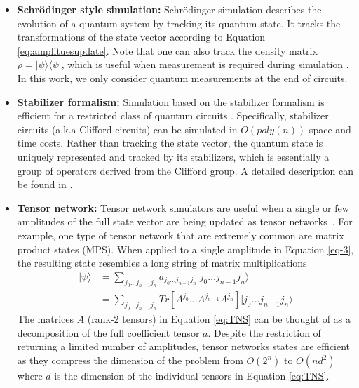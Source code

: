 \begin{itemize}
\item \textbf{Schr\"odinger style simulation:} Schr\"odinger simulation describes the evolution of a quantum system by tracking its quantum state. 
It tracks the transformations of the state vector according to Equation \ref{eq:amplituesupdate}. 
Note that one can also track the density matrix $\rho = |\psi\rangle\langle\psi|$, which is useful when measurement is required during  simulation \cite{10.1109/SC41405.2020.00017, 10.1007/978-3-031-01765-0}. In this work, we only consider quantum measurements at the end of circuits.

\item \textbf{Stabilizer formalism:} Simulation based on the stabilizer formalism is efficient for a restricted class of quantum circuits \cite{10.1103/PhysRevA.70.052328,nielsen_chuang_2010,10.1007/978-3-031-01765-0}. Specifically, stabilizer circuits (a.k.a Clifford circuits) can be simulated in $O(poly(n))$ space and time costs. Rather than tracking the state vector, the quantum state is uniquely represented and tracked by its stabilizers, which is essentially a group of operators derived from the Clifford group. A detailed description can be found in \cite{10.1103/PhysRevA.70.052328}.

\item \textbf{Tensor network:}
Tensor network simulators are useful when a single or few amplitudes of the full state vector are being updated as tensor networks~\cite{10.1371/journal.pone.0206704,10.48550/arXiv.2005.06787,10.1109/QCE53715.2022.00081,10.1137/050644756}.
For example, one type of tensor network that are extremely common are matrix product states (MPS).
When applied to a single amplitude in Equation \ref{eq-3}, the resulting state resembles a long string of matrix multiplications
\begin{align}
|\psi\rangle &= \sum_{j_0\dots j_{n-1}j_{n}} a_{j_0\dots j_{n-1}j_{n}}|j_0\dots j_{n-1}j_{n}\rangle \\
 &= \sum_{j_0\dots j_{n-1}j_{n}} Tr[A^{j_0}\dots A^{j_{n-1}}A^{j_{n}}] |j_0\dots j_{n-1}j_{n}\rangle
 \label{eq:TNS}
\end{align}
The matrices $A$ (rank-2 tensors) in Equation \ref{eq:TNS} can be thought of as a decomposition of the full coefficient tensor $a$.
Despite the restriction of returning a limited number of amplitudes, tensor networks states are efficient as they compress the dimension of the problem from $O(2^n)$ to $O(nd^2)$ where $d$ is the dimension of the individual tensors in Equation \ref{eq:TNS}.
\end{itemize} 

